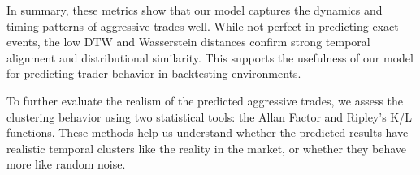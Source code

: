
In summary, these metrics show that our model captures the dynamics and timing patterns of aggressive trades well. While not perfect in predicting exact events, the low DTW and Wasserstein distances confirm strong temporal alignment and distributional similarity. This supports the usefulness of our model for predicting trader behavior in backtesting environments.



To further evaluate the realism of the predicted aggressive trades, we assess the clustering behavior using two statistical tools: the Allan Factor and Ripley's K/L functions. These methods help us understand whether the predicted results have realistic temporal clusters like the reality in the market, or whether they behave more like random noise.

